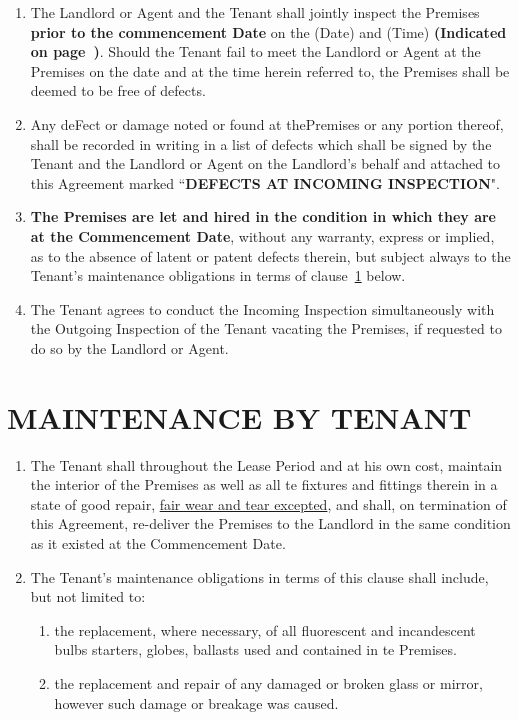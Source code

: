 \documentclass[11pt]{article}
\begin{document}
\begin{enumerate}
	\item The Landlord or Agent and the Tenant shall jointly inspect the Premises \textbf{prior to the commencement Date} on the \underline{\hspace{6em}} (Date) and \underline{\hspace{3em}} (Time) \textbf{(Indicated on page~\pageref{input:commencement-date})}. Should the Tenant fail to meet the Landlord or Agent at the Premises on the date and at the time herein referred to, the Premises shall be deemed to be free of defects.
	\item Any deFect or damage noted or found at thePremises or any  portion thereof, shall be recorded in writing in a list of defects which shall be signed by the Tenant and the Landlord or Agent on the Landlord's behalf and attached to this Agreement marked ``\textbf{DEFECTS AT INCOMING INSPECTION}".
	\item \textbf{The Premises are let and hired in the condition in which they are at the Commencement Date}, without any warranty, express or implied, as to the absence of latent or patent defects therein, but subject always to the Tenant's maintenance obligations in terms of clause~\ref{sec:maintenance-by-tenant} below.
	\item The Tenant agrees to conduct the Incoming Inspection simultaneously with the Outgoing Inspection of the Tenant vacating the Premises, if requested to do so by the Landlord or Agent.
\end{enumerate}


\section{\uppercase{maintenance by tenant}}
\label{sec:maintenance-by-tenant}

\begin{enumerate}
	\item The Tenant shall throughout the Lease Period and at his own cost, maintain the interior of the Premises as well as all te fixtures and fittings therein in a state of good repair, \underline{fair wear and tear excepted}, and shall, on termination of this Agreement, re-deliver the Premises to the Landlord in the same condition as it existed at the Commencement Date.
	\item The Tenant's maintenance obligations in terms of this clause shall include, but not limited to:
		\begin{enumerate}
			\item the replacement, where necessary, of all fluorescent and incandescent bulbs starters, globes, ballasts used and contained in te Premises.
			\item the replacement and repair of any damaged or broken glass or mirror, however such damage or breakage was caused.
		\end{enumerate}
\end{enumerate}
\end{document}
